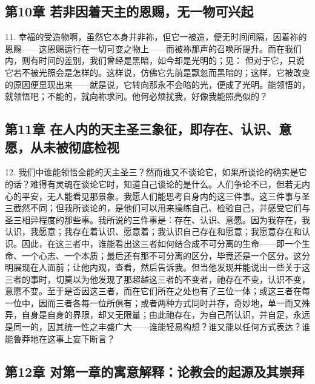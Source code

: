 \subsection{第10章 若非因着天主的恩赐，无一物可兴起}

11. 幸福的受造物啊，虽然它本身并非祢，但它一被造，便无时间间隔，因着祢的恩赐——这恩赐运行在一切可变之物上——而被祢那声的召唤所提升。而在我们内，则有时间的差别，我们曾经是黑暗，如今却是光明的；见： 但对于它，只说它若不被光照会是怎样的。这样说，仿佛它先前是飘忽而黑暗的；这样，它被改变的原因便显现出来——就是说，它转向那永不会暗的光，便成了光明。能领悟的，就领悟吧；不能的，就向祢求问。他何必烦扰我，好像我能照亮似的？\par


\subsection{第11章 在人内的天主圣三象征，即存在、认识、意愿，从未被彻底检视}

12. 我们中谁能领悟全能的天主圣三？然而谁又不谈论它，如果所谈论的确实是它的话？难得有灵魂在谈论它时，知道自己谈论的是什么。人们争论不已，但若无内心的平安，无人能看见那景象。我愿人们能思考自身内的这三件事。这三件事与圣三截然不同；但我所谈论的，是他们可以用来操练自己、检验自己，并感受它们与圣三相异程度的那些事。我所说的三件事是：存在、认识、意愿。因为我存在，我认识，我愿意；我存在着认识、愿意着；我认识自己存在和愿意；我愿意存在和认识。因此，在这三者中，谁能看出这三者如何结合成不可分离的生命——即一个生命、一个心志、一个本质；最后还有那不可分离的区分，毕竟还是一个区分。这分明展现在人面前；让他内观，查看，然后告诉我。但当他发现并能说出一些关于这三者的事时，切莫以为他发现了那超越这三者的不变者，祂存在不变，认识不变，意愿不变。至于是否因这三者，而在它们所在之处也有了三位一体；或这三者在每一位中，因而三者各每一位所俱有；或者两种方式同时并存，奇妙地，单一而又殊异，自身是自身的界限，却又无限量；由此祂存在，为自己所认识，并自足，永远是同一的，因其统一性之丰盛广大——谁能轻易构想？谁又能以任何方式表达？谁能鲁莽地在这事上妄下断言？\par


\subsection{第12章 对第一章的寓意解释：论教会的起源及其崇拜}

